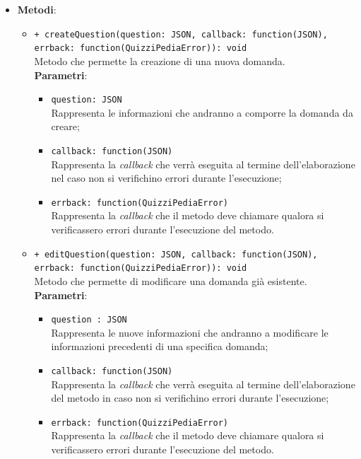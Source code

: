 \begin{itemize}
\begin{itemize}
\begin{itemize}
		\end{itemize}
	\end{itemize}
\item \textbf{Metodi}:
	\begin{itemize}
	\item \texttt{+ createQuestion(question: JSON, callback: function(JSON),\\ errback: function(QuizziPediaError)): void} \\
	Metodo che permette la creazione di una nuova domanda. \\
		\textbf{Parametri}:
		\begin{itemize}
			\item \texttt{question: JSON} \\
			Rappresenta le informazioni che andranno a comporre la domanda da creare;
			\item \texttt{callback: function(JSON)} \\
			Rappresenta la \textit{callback} che verrà eseguita al termine dell'elaborazione nel caso non si verifichino errori durante l'esecuzione;
			\item \texttt{errback: function(QuizziPediaError)} \\
			Rappresenta la \textit{callback} che il metodo deve chiamare qualora si verificassero errori durante l'esecuzione del metodo.
		\end{itemize}   
	\item \texttt{+ editQuestion(question: JSON, callback: function(JSON),\\ errback: function(QuizziPediaError)): void} \\
	Metodo che permette di modificare una domanda già esistente. \\
		\textbf{Parametri}:
		\begin{itemize}
			\item \texttt{question : JSON} \\
			Rappresenta le nuove informazioni che andranno a modificare le informazioni precedenti di una specifica domanda;
			\item \texttt{callback: function(JSON)} \\
			Rappresenta la \textit{callback} che verrà eseguita al termine dell'elaborazione del metodo in caso non si verifichino errori durante l'esecuzione;
			\item \texttt{errback: function(QuizziPediaError)} \\
			Rappresenta la \textit{callback} che il metodo deve chiamare qualora si verificassero errori durante l'esecuzione del metodo.

\end{itemize}
\end{itemize}
\end{itemize}
